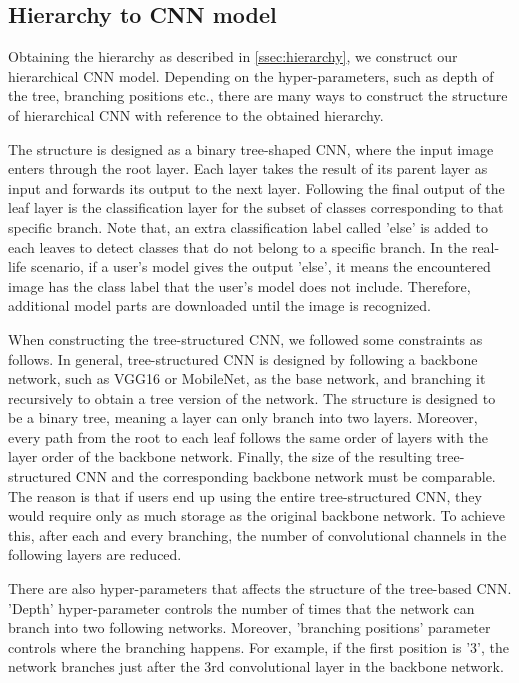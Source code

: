 \subsection{Hierarchy to CNN model}
\label{ssec:hiertoCNN}

Obtaining the hierarchy as described in \ref{ssec:hierarchy}, we construct our hierarchical CNN model. Depending on the hyper-parameters, such as depth of the tree, branching positions etc., there are many ways to construct the structure of hierarchical CNN with reference to the obtained hierarchy.

The structure is designed as a binary tree-shaped CNN, where the input image enters through the root layer.
Each layer takes the result of its parent layer as input and forwards its output to the next layer. 
Following the final output of the leaf layer is the classification layer for the subset of classes corresponding to that specific branch.
Note that, an extra classification label called 'else' is added to each leaves to detect classes that do not belong to a specific branch.
In the real-life scenario, if a user's model gives the output 'else', it means the encountered image has the class label that the user's model does not include.  
Therefore, additional model parts are downloaded until the image is recognized.

When constructing the tree-structured CNN, we followed some constraints as follows. 
In general, tree-structured CNN is designed by following a backbone network, such as VGG16 or MobileNet, as the base network, and branching it recursively to obtain a tree version of the network.
The structure is designed to be a binary tree, meaning a layer can only branch into two layers. 
Moreover, every path from the root to each leaf follows the same order of layers with the layer order of the backbone network.
Finally, the size of the resulting tree-structured CNN and the corresponding backbone network must be comparable. 
The reason is that if users end up using the entire tree-structured CNN, they would require only as much storage as the original backbone network.
To achieve this, after each and every branching, the number of convolutional channels in the following layers are reduced.

There are also hyper-parameters that affects the structure of the tree-based CNN. 
'Depth' hyper-parameter controls the number of times that the network can branch into two following networks. 
Moreover, 'branching positions' parameter controls where the branching happens.
For example, if the first position is '3', the network branches just after the 3rd convolutional layer in the backbone network.

